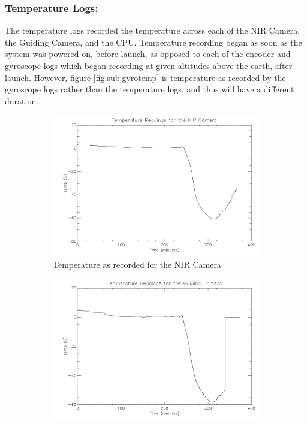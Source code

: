\subsubsection*{Temperature Logs:}
The temperature logs recorded the temperature across each of the NIR Camera, the Guiding Camera, and the CPU. Temperature recording began as soon as the system was powered on, before launch, as opposed to each of the encoder and gyroscope logs which began recording at given altitudes above the earth, after launch. However, figure \ref{fig:sub:gyrotemp} is temperature as recorded by the gyroscope logs rather than the temperature logs, and thus will have a different duration. 

\begin{figure}[htbp]
\captionsetup[subfigure]{justification=centering}
\captionsetup{justification=centering}
    \centering
    \begin{subfigure}{0.45\textwidth}
		\includegraphics[width=1\linewidth]{appendix/img/campaign_results/tempnir.png}
		\caption{Temperature as recorded for the NIR Camera}
		\label{fig:sub:NIRtemp}
	\end{subfigure}
	\begin{subfigure}{0.45\textwidth}
		\includegraphics[width=1\linewidth]{appendix/img/campaign_results/tempgc.png}

\end{subfigure}
\end{figure}

